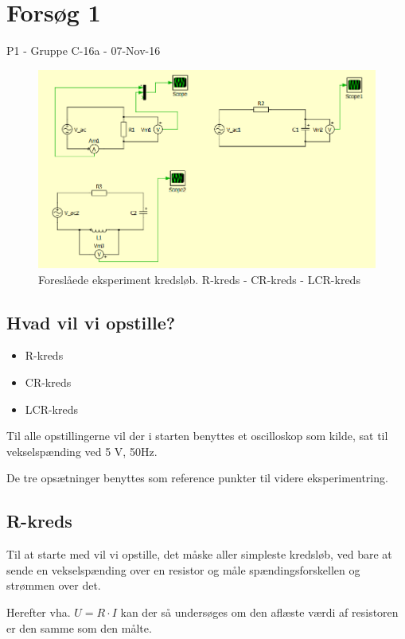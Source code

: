 \chapter{Forsøg 1} \label{bilag:forsg1}

P1 - Gruppe C-16a - 07-Nov-16

\begin{figure}[htbp]
\centering
\includegraphics[width=1\textwidth]{Vildledning/Schematics/Eks1_LCR.png}
\caption{Foreslåede eksperiment kredsløb. R-kreds - CR-kreds - LCR-kreds}
\label{fig:Eks1}
\end{figure}
\newpage

\section{Hvad vil vi opstille?}
\begin{itemize}
\item R-kreds
\item CR-kreds
\item LCR-kreds
\end{itemize}
Til alle opstillingerne vil der i starten benyttes et oscilloskop som kilde, sat til vekselspænding ved 5 V, 50Hz.

De tre opsætninger benyttes som reference punkter til videre eksperimentring.  
\section{R-kreds}
Til at starte med vil vi opstille, det måske aller simpleste kredsløb, ved bare at sende en vekselspænding over en resistor og måle spændingsforskellen og strømmen over det.

Herefter vha. $U=R\cdot I$ kan der så undersøges om den aflæste værdi af resistoren er den samme som den målte.
